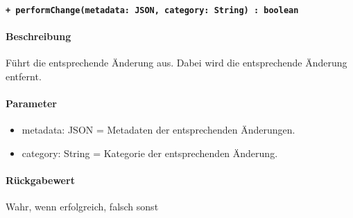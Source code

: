 \paragraph{\texttt{+ performChange(metadata: JSON, category: String) : boolean}}\label{AP_Framework_performChange}%
\paragraph*{Beschreibung}
Führt die entsprechende Änderung aus.
Dabei wird die entsprechende Änderung entfernt.
\paragraph*{Parameter}
\begin{itemize}
    \item metadata: JSON = Metadaten der entsprechenden Änderungen.
    \item category: String = Kategorie der entsprechenden Änderung.
\end{itemize}
\paragraph*{Rückgabewert}
Wahr, wenn erfolgreich, falsch sonst
